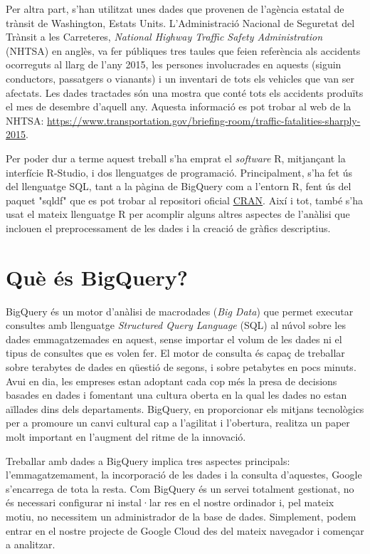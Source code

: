 \documentclass[12pt,longbibliography]{article}
\theoremstyle{definition}
\theoremstyle{remark}
\begin{document}
Per altra part, s'han utilitzat unes dades que provenen de l'agència estatal de trànsit de Washington, Estats Units. L'Administració Nacional de Seguretat del Trànsit a les Carreteres, \textit{National Highway Traffic Safety Administration} (NHTSA) en anglès, va fer públiques tres taules que feien referència als accidents ocorreguts al llarg de l'any 2015, les persones involucrades en aquests (siguin conductors, passatgers o vianants) i un inventari de tots els vehicles que van ser afectats. Les dades tractades són una mostra que conté tots els accidents produïts el mes de desembre d'aquell any. Aquesta informació es pot trobar al web de la NHTSA: \url{https://www.transportation.gov/briefing-room/traffic-fatalities-sharply-2015}.

Per poder dur a terme aquest treball s'ha emprat el \textit{software} R, mitjançant la interfície R-Studio, i dos llenguatges de programació. Principalment, s'ha fet ús del llenguatge SQL, tant a la pàgina de BigQuery com a l'entorn R, fent ús del paquet "sqldf" que es pot trobar al repositori oficial \href{https://cran.r-project.org}{CRAN}. Així i tot, també s'ha usat el mateix llenguatge R per acomplir alguns altres aspectes de l'anàlisi que inclouen el preprocessament de les dades i la creació de gràfics descriptius.

\pagebreak

\section{Què és BigQuery?}

BigQuery és un motor d’anàlisi de macrodades (\textit{Big Data}) que permet executar consultes amb llenguatge \emph{Structured Query Language} (SQL) al núvol sobre les dades emmagatzemades en aquest, sense importar el volum de les dades ni el tipus de consultes que es volen fer. El motor de consulta és capaç de treballar sobre terabytes de dades en qüestió de segons, i sobre petabytes en pocs minuts. Avui en dia, les empreses estan adoptant cada cop més la presa de decisions basades en dades i fomentant una cultura oberta en la qual les dades no estan aïllades dins dels departaments. BigQuery, en proporcionar els mitjans tecnològics per a promoure un canvi cultural cap a l’agilitat i l’obertura, realitza un paper molt important en l’augment del ritme de la innovació.


Treballar amb dades a BigQuery implica tres aspectes principals: l’emmagatzemament, la incorporació de les dades i la consulta d’aquestes, Google s’encarrega de tota la resta. Com BigQuery és un servei totalment gestionat, no és necessari configurar ni instal·lar res en el nostre ordinador i, pel mateix motiu, no necessitem un administrador de la base de dades. Simplement, podem entrar en el nostre projecte de Google Cloud des del mateix navegador i començar a analitzar.
\end{document}
